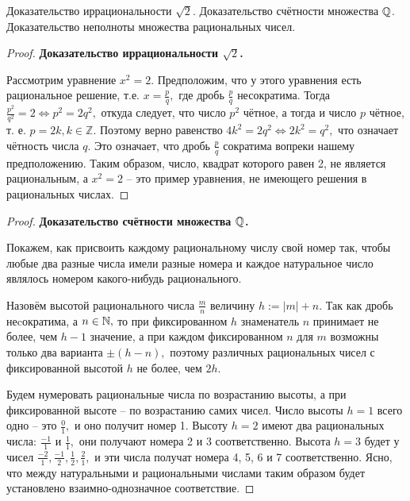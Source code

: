 \begin{problem}
Доказательство иррациональности $\sqrt{2}$. Доказательство счётности множества $\mathbb{Q}$. Доказательство неполноты множества рациональных чисел.
\end{problem}

\begin{proof} \textbf{Доказательство иррациональности $\sqrt{2}$.}

    Рассмотрим
    уравнение $x^2=2.$ Предположим,
    что у этого уравнения есть
    рациональное решение, т.е.
    $x=\frac{p}{q},$ где дробь
    $\frac{p}{q}$ несократима.
    Тогда $\frac{p^2}{q^2}=2
        \Leftrightarrow p^2=2q^2,$
    откуда следует, что число
    $p^2$ чётное, а тогда и число
    $p$ чётное, т. е. $p=2k,
        k\in\mathbb{Z}.$ Поэтому
    верно равенство $4k^2=2q^2
        \Leftrightarrow 2k^2=q^2,$
    что означает чётность числа
    $q.$ Это означает, что дробь
    $\frac{p}{q}$ сократима
    вопреки нашему предположению.
    Таким образом, число,
    квадрат которого равен
    2, не является рациональным,
    а $x^2=2$ -- это пример уравнения,
    не имеющего решения в рациональных
    числах.
\end{proof}


\begin{proof} \textbf{Доказательство счётности множества $\mathbb{Q}$.}

    Покажем, как присвоить каждому рациональному
    числу свой номер так, чтобы любые два разные
    числа имели разные номера и каждое натуральное
    число являлось номером какого-нибудь
    рационального.

    Назовём высотой рационального числа $\frac{m}{n}$
    величину $h:=|m|+n.$
    Так как дробь неcократима, а $n\in\mathbb{N},$ то
    при фиксированном $h$ знаменатель $n$ принимает
    не более, чем $h-1$ значение, а при каждом
    фиксированном $n$ для $m$ возможны
    только два варианта $\pm(h-n),$
    поэтому различных рациональных чисел
    с фиксированной высотой $h$ не более, чем
    $2h.$

    Будем нумеровать рациональные
    числа по возрастанию высоты, а при
    фиксированной высоте -- по возрастанию
    самих чисел.
    Число высоты $h=1$ всего одно -- это
    $\frac{0}{1},$ и оно получит номер 1.
    Высоту $h=2$ имеют два рациональных
    числа: $\frac{-1}{1}$ и $\frac{1}{1},$
    они получают номера 2 и 3 соответственно.
    Высота $h=3$ будет у чисел $\frac{-2}{1},
        \frac{-1}{2}, \frac{1}{2}, \frac{2}{1},$
    и эти числа получат номера 4, 5, 6 и 7
    соответственно. Ясно, что между
    натуральными и рациональными
    числами таким образом будет установлено
    взаимно-однозначное соответствие.
\end{proof}

